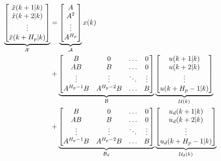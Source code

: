 \begin{equation}
\begin{aligned}
	  \underbrace{\begin{bmatrix}
	  \hat{x}(k+1|k) 	\\
	  \hat{x}(k+2|k) 	\\
	  \vdots 			\\
	  \hat{x}(k+H_p|k) 	\\
	   \end{bmatrix}}_{\CMcal{X}}
	 &=
	\underbrace{\begin{bmatrix}
		A \\
		A^2 \\
		\vdots \\
		A^{H_p} \\
	\end{bmatrix}}_{\CMcal{A}}
	x(k) \\&+
	\underbrace{\begin{bmatrix}
		B 		 &0			 &\hdots	& 0		\\
		AB  	 &B  		 & \hdots& 0		\\
		\vdots 	 &\vdots	 & \ddots&\vdots	\\
		A^{H_p-1}B&A^{H_p-2}B&\hdots &B 
    \end{bmatrix}}_{\CMcal{B}}
    	\underbrace{\begin{bmatrix}
	u(k+1|k)\\
	u(k+2|k)\\
	\vdots\\
	u(k+H_p-1|k)
	\end{bmatrix}}_{\CMcal{U}(k)} \\ &+ 
    \underbrace{\begin{bmatrix}
    	B 		  &0	     &\hdots	& 0		\\
		AB  	  &B  		 & \hdots& 0		\\
		\vdots 	  &\vdots	 & \ddots&\vdots	\\
		A^{H_p-1}B&A^{H_p-2}B&\hdots &B 
	  \end{bmatrix}}_{\CMcal{B}_d} 
	\underbrace{\begin{bmatrix}
	u_d(k+1|k)\\
	u_d(k+2|k)\\
	\vdots\\
	u_d(k+H_p-1|k)
	\end{bmatrix}}_{\CMcal{U}_d(k)}
	\end{aligned}
\end{equation}






